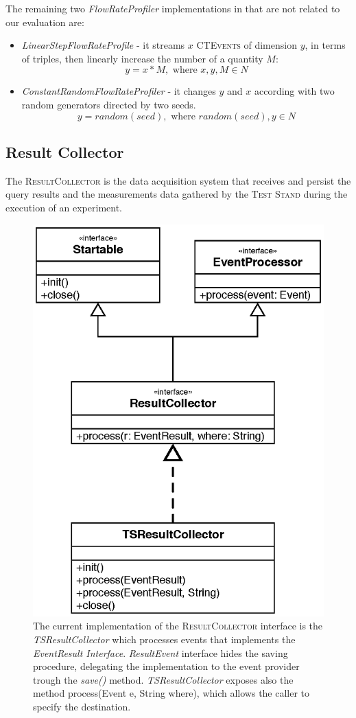 The remaining two  \textit{FlowRateProfiler} implementations in \name that are not related to our evaluation are:
\begin{itemize}
\item \textit{LinearStepFlowRateProfile} - it streams $x$ \textsc{CTEvents} of dimension $y$, in terms of triples, then linearly increase the number of a quantity $M$: \[y=x*M, \text{ where } x,y,M \in N\]
\item \textit{ConstantRandomFlowRateProfiler} - it changes $y$ and $x$ according with two random generators directed by two seeds. \[y=random(seed), \text{ where } random(seed),y \in N\]
\end{itemize}


\subsection{Result Collector} 

\noindent The \textsc{ResultCollector} is the data acquisition system that receives and persist the query results and the measurements data gathered by the \textsc{Test Stand} during the execution of an experiment.

\begin{figure}[tbh]
  \centering
	\includegraphics[width=0.5\linewidth]{images/uml_resultcollector}
	\caption[\textsc{ResultCollector} Current Implementation - UML Schema]{The current implementation of the \textsc{ResultCollector} interface is the \textit{TSResultCollector} which processes events that implements the \textit{EventResult Interface}. \textit{ResultEvent} interface hides the saving procedure, delegating the implementation to the event provider trough    the \textit{save()} method. \textit{TSResultCollector} exposes also the method process(Event e, String where), which allows the caller to specify the destination. } 
  	\label{fig:uml_resultcollector}
\end{figure}

